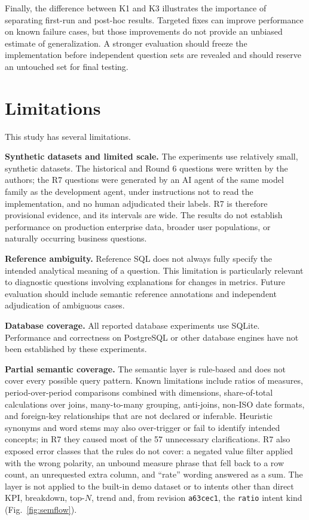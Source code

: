 \documentclass[conference]{IEEEtran}
\begin{document}
Finally, the difference between K1 and K3 illustrates the importance of separating first-run and post-hoc results. Targeted fixes can improve performance on known failure cases, but those improvements do not provide an unbiased estimate of generalization. A stronger evaluation should freeze the implementation before independent question sets are revealed and should reserve an untouched set for final testing.

\section{Limitations}

This study has several limitations.

\textbf{Synthetic datasets and limited scale.} The experiments use relatively small, synthetic datasets. The historical and Round 6 questions were written by the authors; the R7 questions were generated by an AI agent of the same model family as the development agent, under instructions not to read the implementation, and no human adjudicated their labels. R7 is therefore provisional evidence, and its intervals are wide. The results do not establish performance on production enterprise data, broader user populations, or naturally occurring business questions.

\textbf{Reference ambiguity.} Reference SQL does not always fully specify the intended analytical meaning of a question. This limitation is particularly relevant to diagnostic questions involving explanations for changes in metrics. Future evaluation should include semantic reference annotations and independent adjudication of ambiguous cases.

\textbf{Database coverage.} All reported database experiments use SQLite. Performance and correctness on PostgreSQL or other database engines have not been established by these experiments.

\textbf{Partial semantic coverage.} The semantic layer is rule-based and does not cover every possible query pattern. Known limitations include ratios of measures, period-over-period comparisons combined with dimensions, share-of-total calculations over joins, many-to-many grouping, anti-joins, non-ISO date formats, and foreign-key relationships that are not declared or inferable. Heuristic synonyms and word stems may also over-trigger or fail to identify intended concepts; in R7 they caused most of the 57 unnecessary clarifications. R7 also exposed error classes that the rules do not cover: a negated value filter applied with the wrong polarity, an unbound measure phrase that fell back to a row count, an unrequested extra column, and ``rate'' wording answered as a sum. The layer is not applied to the built-in demo dataset or to intents other than direct KPI, breakdown, top-$N$, trend and, from revision \texttt{a63cec1}, the \texttt{ratio} intent kind (Fig.~\ref{fig:semflow}).
\end{document}
